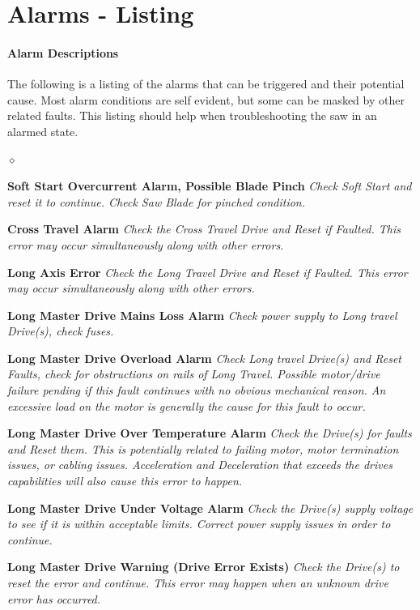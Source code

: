 \section{Alarms - Listing}
\paragraph*{Alarm Descriptions}
The following is a listing of the alarms that can be triggered and their potential cause. Most alarm conditions are self evident, but some can be masked by other related faults. This listing should help when troubleshooting the saw in an alarmed state.
\begin{list}{$\diamond$}{}
	\item \textbf{Soft Start Overcurrent Alarm, Possible Blade Pinch} \textit{Check Soft Start and reset it to continue. Check Saw Blade for pinched condition.}
	\item \textbf{Cross Travel Alarm} \textit{Check the Cross Travel Drive and Reset if Faulted. This error may occur simultaneously along with other errors.}
	\item \textbf{Long Axis Error} \textit{Check the Long Travel Drive and Reset if Faulted. This error may occur simultaneously along with other errors.}
	\item \textbf{Long Master Drive Mains Loss Alarm} \textit{Check power supply to Long travel Drive(s), check fuses.}
	\item \textbf{Long Master Drive Overload Alarm} \textit{Check Long travel Drive(s) and Reset Faults, check for obstructions on rails of Long Travel. Possible motor/drive failure pending if this fault continues with no obvious mechanical reason. An excessive load on the motor is generally the cause for this fault to occur.}
	\item \textbf{Long Master Drive Over Temperature Alarm} \textit{Check the Drive(s) for faults and Reset them. This is potentially related to failing motor, motor termination issues, or cabling issues. Acceleration and Deceleration that exceeds the drives capabilities will also cause this error to happen.}
	\item \textbf{Long Master Drive Under Voltage Alarm} \textit{Check the Drive(s) supply voltage to see if it is within acceptable limits. Correct power supply issues in  order to continue.}
	\item \textbf{Long Master Drive Warning (Drive Error Exists)} \textit{Check the Drive(s) to reset the error and continue. This error may happen when an unknown drive error has occurred.}

\end{list}
